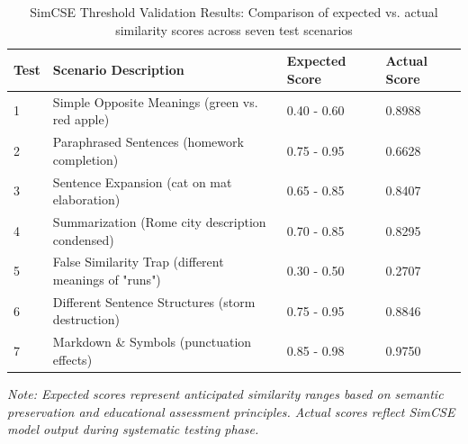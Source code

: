 \begin{table}[htbp]
    \centering
    \caption{SimCSE Threshold Validation Results: Comparison of expected vs. actual similarity scores across seven test scenarios}
    \label{table:threshold_validation}
    \begin{tabular}{|p{0.8cm}|p{5.5cm}|p{2.8cm}|p{2.8cm}|}
        \hline
        \textbf{Test} & \textbf{Scenario Description} & \textbf{Expected Score} & \textbf{Actual Score} \\
        \hline
        1 & Simple Opposite Meanings (green vs. red apple) & 0.40 - 0.60 & 0.8988 \\
        \hline
        2 & Paraphrased Sentences (homework completion) & 0.75 - 0.95 & 0.6628 \\
        \hline
        3 & Sentence Expansion (cat on mat elaboration) & 0.65 - 0.85 & 0.8407 \\
        \hline
        4 & Summarization (Rome city description condensed) & 0.70 - 0.85 & 0.8295 \\
        \hline
        5 & False Similarity Trap (different meanings of "runs") & 0.30 - 0.50 & 0.2707 \\
        \hline
        6 & Different Sentence Structures (storm destruction) & 0.75 - 0.95 & 0.8846 \\
        \hline
        7 & Markdown \& Symbols (punctuation effects) & 0.85 - 0.98 & 0.9750 \\
        \hline
    \end{tabular}
    \vspace{0.3cm}
    
    {\footnotesize
    \textit{Note: Expected scores represent anticipated similarity ranges based on semantic preservation and educational assessment principles. Actual scores reflect SimCSE model output during systematic testing phase.}
    }
\end{table}